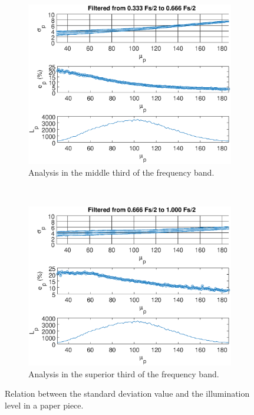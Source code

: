 \documentclass[review]{elsarticle}
\begin{document}
\begin{figure}[h!]
    ~\\ 
    \begin{subfigure}[b]{0.475\textwidth}
        \includegraphics[width=\textwidth]{stdy_curve.eps}
	\caption{Analysis in the middle third of the frequency band.}
        \label{fig:illlevel_stdy}
    \end{subfigure}
  ~
    \begin{subfigure}[b]{0.475\textwidth}
        \includegraphics[width=\textwidth]{stdz_curve.eps}
	\caption{Analysis in the superior third of the frequency band.}
        \label{fig:illlevel_stdz}
    \end{subfigure}
    
    \caption{Relation between the standard deviation value and the illumination level in a paper piece.}
    \label{fig:papelilllevel}
\end{figure}
\end{document}
